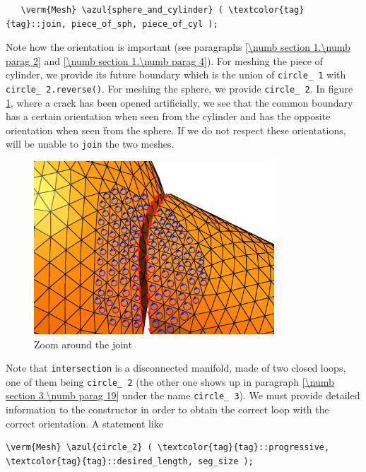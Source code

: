 \begin{Verbatim}
   \verm{Mesh} \azul{sphere_and_cylinder} ( \textcolor{tag}{tag}::join, piece_of_sph, piece_of_cyl );
\end{Verbatim}

Note how the orientation is important (see paragraphs \ref{\numb section 1.\numb parag 2}
and \ref{\numb section 1.\numb parag 4}).
For meshing the piece of cylinder, we provide its future boundary which is the union of
{\small\tt circle\_\,1} with {\small\tt circle\_\,2.reverse()}.
For meshing the sphere, we provide {\small\tt circle\_\,2}.
In figure \ref{\numb section 3.\numb fig 6}, where a crack has been opened artificially,
we see that the common boundary has a certain orientation when seen from the cylinder and
has the opposite orientation when seen from the sphere.
If we do not respect these orientations, {\maniFEM} will be unable to {\small\tt join} the two
meshes.

\begin{figure}[ht] \centering
 \includegraphics[width=90mm]{crack}
  \caption{Zoom around the joint}
  \label{\numb section 3.\numb fig 6}
\end{figure}

Note that {\small\tt intersection} is a disconnected manifold, made of two closed loops,
one of them being {\small\tt circle\_\,2} (the other one shows up in
paragraph \ref{\numb section 3.\numb parag 19} under the name {\small\tt circle\_\,3}).
We must provide detailed information to the {\small\tt{}} constructor in order to
obtain the correct loop with the correct orientation.
A statement like

\begin{Verbatim}[commandchars=\\\{\},formatcom=\small\tt,
   baselinestretch=0.94,framesep=2mm                     ]
   \verm{Mesh} \azul{circle_2} ( \textcolor{tag}{tag}::progressive, \textcolor{tag}{tag}::desired_length, seg_size );
\end{Verbatim}

